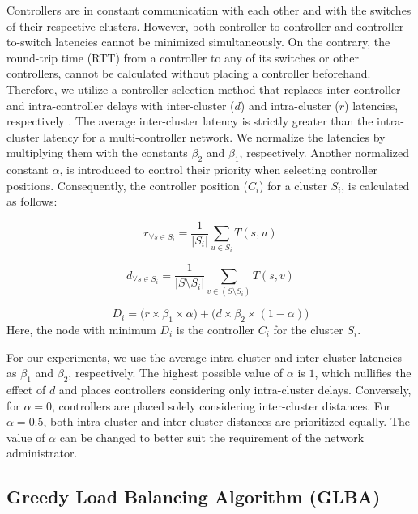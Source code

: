 \documentclass[a4paper,fleqn]{cas-dc}
\begin{document}
Controllers are in constant communication with each other and with the switches of their respective clusters. However, both controller-to-controller and controller-to-switch latencies cannot be minimized simultaneously. On the contrary, the round-trip time (RTT) from a controller to any of its switches or other controllers, cannot be calculated without placing a controller beforehand. Therefore, we utilize a controller selection method that replaces inter-controller and intra-controller delays with inter-cluster ($d$) and intra-cluster ($r$) latencies, respectively \cite{aziz2019degree}. The average inter-cluster latency is strictly greater than the intra-cluster latency for a multi-controller network. We normalize the latencies by multiplying them with the constants $\beta_2$ and $\beta_1$, respectively. Another normalized constant $\alpha$, is introduced to control their priority when selecting controller positions. Consequently, the controller position ($C_i$) for a cluster $S_i$, is calculated as follows:

\begin{equation} \label{eqn:intra}
r_{\forall s\in S_i} = \frac{1}{|S_i|}\sum_{u\in S_i} T(s,u)
\end{equation}

\begin{equation} \label{eqn:inter}
d_{\forall s\in S_i} = \frac{1}{|S\setminus S_i|}\sum_{v\in (S\setminus S_i)} T(s,v)
\end{equation}

\begin{equation} \label{eqn:totlat}
D_i = \big( r\times \beta_1 \times \alpha \big) + \big( d \times \beta_2 \times (1-\alpha) \big)
\end{equation}
Here, the node with minimum $D_i$ is the controller $C_i$ for the cluster $S_i$.

For our experiments, we use the average intra-cluster and inter-cluster latencies as $\beta_1$ and $\beta_2$, respectively. The highest possible value of $\alpha$ is $1$, which nullifies the effect of $d$ and places controllers considering only intra-cluster delays. Conversely, for $\alpha = 0$, controllers are placed solely considering inter-cluster distances. For $\alpha=0.5$, both intra-cluster and inter-cluster distances are prioritized equally. The value of $\alpha$ can be changed to better suit the requirement of the network administrator.

\subsection{Greedy Load Balancing Algorithm (GLBA)} \label{glba}
\end{document}
